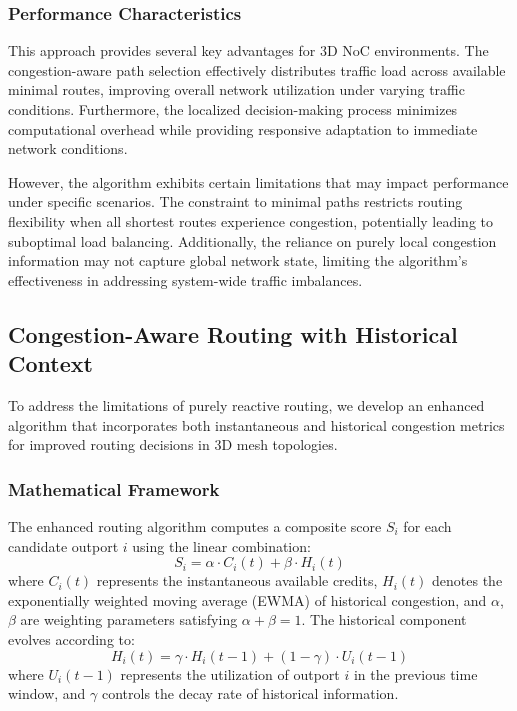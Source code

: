 \documentclass[11pt]{article}
\begin{document}
\subsubsection{Performance Characteristics}
This approach provides several key advantages for 3D NoC environments. The congestion-aware path selection effectively distributes traffic load across available minimal routes, improving overall network utilization under varying traffic conditions. Furthermore, the localized decision-making process minimizes computational overhead while providing responsive adaptation to immediate network conditions.

However, the algorithm exhibits certain limitations that may impact performance under specific scenarios. The constraint to minimal paths restricts routing flexibility when all shortest routes experience congestion, potentially leading to suboptimal load balancing. Additionally, the reliance on purely local congestion information may not capture global network state, limiting the algorithm's effectiveness in addressing system-wide traffic imbalances.

\subsection{Congestion-Aware Routing with Historical Context}

To address the limitations of purely reactive routing, we develop an enhanced algorithm that incorporates both instantaneous and historical congestion metrics for improved routing decisions in 3D mesh topologies.

\subsubsection{Mathematical Framework}
The enhanced routing algorithm computes a composite score $S_i$ for each candidate outport $i$ using the linear combination:
\begin{equation}
S_i = \alpha \cdot C_i(t) + \beta \cdot H_i(t)
\end{equation}
where $C_i(t)$ represents the instantaneous available credits, $H_i(t)$ denotes the exponentially weighted moving average (EWMA) of historical congestion, and $\alpha$, $\beta$ are weighting parameters satisfying $\alpha + \beta = 1$. The historical component evolves according to:
\begin{equation}
H_i(t) = \gamma \cdot H_i(t-1) + (1-\gamma) \cdot U_i(t-1)
\end{equation}
where $U_i(t-1)$ represents the utilization of outport $i$ in the previous time window, and $\gamma$ controls the decay rate of historical information.
\end{document}
